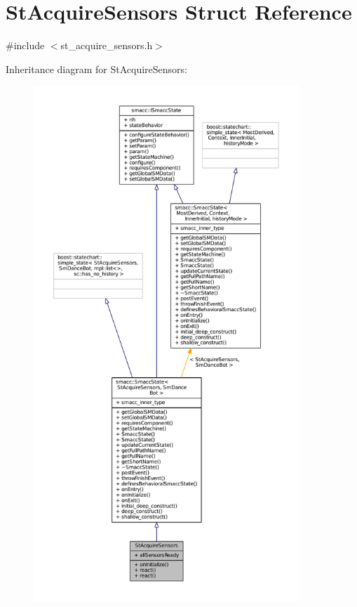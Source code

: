 \hypertarget{structStAcquireSensors}{}\section{St\+Acquire\+Sensors Struct Reference}
\label{structStAcquireSensors}


{\ttfamily \#include $<$st\+\_\+acquire\+\_\+sensors.\+h$>$}



Inheritance diagram for St\+Acquire\+Sensors\+:
\nopagebreak
\begin{figure}[H]
\begin{center}
\leavevmode
\includegraphics[height=550pt]{structStAcquireSensors__inherit__graph}
\end{center}
\end{figure}


